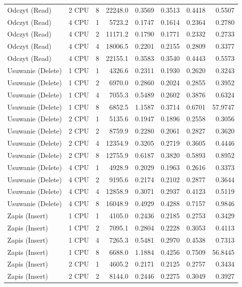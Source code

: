 \begin{table}[ht]
{\begin{tabular}{llcrrrrr}
Odczyt (Read) & 2 CPU & 8 & 22248.0 & 0.3569 & 0.3513 & 0.4418 & 0.5507 \\
Odczyt (Read) & 4 CPU & 1 & 5723.2 & 0.1747 & 0.1614 & 0.2364 & 0.2780 \\
Odczyt (Read) & 4 CPU & 2 & 11171.2 & 0.1790 & 0.1771 & 0.2332 & 0.2733 \\
Odczyt (Read) & 4 CPU & 4 & 18006.5 & 0.2201 & 0.2155 & 0.2809 & 0.3377 \\
Odczyt (Read) & 4 CPU & 8 & 22155.1 & 0.3583 & 0.3540 & 0.4443 & 0.5573 \\
Usuwanie (Delete) & 1 CPU & 1 & 4326.6 & 0.2311 & 0.1930 & 0.2620 & 0.3243 \\
Usuwanie (Delete) & 1 CPU & 2 & 6970.0 & 0.2860 & 0.2024 & 0.2855 & 0.3952 \\
Usuwanie (Delete) & 1 CPU & 4 & 7055.3 & 0.5489 & 0.2602 & 0.3876 & 0.6324 \\
Usuwanie (Delete) & 1 CPU & 8 & 6852.5 & 1.1587 & 0.3714 & 0.6701 & 57.9747 \\
Usuwanie (Delete) & 2 CPU & 1 & 5135.6 & 0.1947 & 0.1896 & 0.2558 & 0.3056 \\
Usuwanie (Delete) & 2 CPU & 2 & 8759.9 & 0.2280 & 0.2061 & 0.2827 & 0.3620 \\
Usuwanie (Delete) & 2 CPU & 4 & 12354.9 & 0.3205 & 0.2719 & 0.3605 & 0.4446 \\
Usuwanie (Delete) & 2 CPU & 8 & 12755.9 & 0.6187 & 0.3820 & 0.5893 & 0.8952 \\
Usuwanie (Delete) & 4 CPU & 1 & 4928.9 & 0.2029 & 0.1963 & 0.2616 & 0.3373 \\
Usuwanie (Delete) & 4 CPU & 2 & 9195.6 & 0.2174 & 0.2102 & 0.2877 & 0.3644 \\
Usuwanie (Delete) & 4 CPU & 4 & 12858.9 & 0.3071 & 0.2937 & 0.4123 & 0.5119 \\
Usuwanie (Delete) & 4 CPU & 8 & 16048.9 & 0.4929 & 0.4288 & 0.7157 & 0.9846 \\
Zapis (Insert) & 1 CPU & 1 & 4105.0 & 0.2436 & 0.2185 & 0.2753 & 0.3429 \\
Zapis (Insert) & 1 CPU & 2 & 7095.1 & 0.2804 & 0.2228 & 0.3053 & 0.4113 \\
Zapis (Insert) & 1 CPU & 4 & 7265.3 & 0.5481 & 0.2970 & 0.4538 & 0.7313 \\
Zapis (Insert) & 1 CPU & 8 & 6688.0 & 1.1884 & 0.4256 & 0.7509 & 56.8445 \\
Zapis (Insert) & 2 CPU & 1 & 4605.2 & 0.2171 & 0.2125 & 0.2757 & 0.3434 \\
Zapis (Insert) & 2 CPU & 2 & 8144.0 & 0.2446 & 0.2275 & 0.3049 & 0.3927 \\

\end{tabular}}
\end{table}
